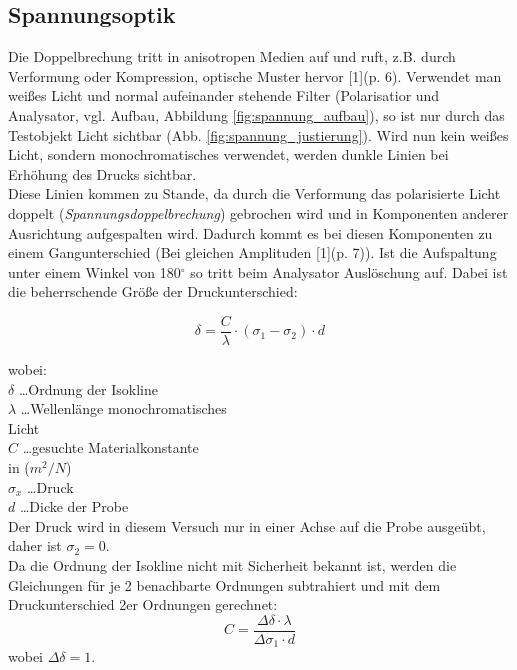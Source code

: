 \documentclass[12pt,a4paper]{article}
\begin{document}
\begin{multicols}{2}
\subsection{Spannungsoptik}
Die Doppelbrechung tritt in anisotropen Medien auf und ruft, z.B. durch Verformung oder Kompression, optische Muster hervor [1](p. 6). Verwendet man weißes Licht und normal aufeinander stehende Filter (Polarisatior und Analysator, vgl. Aufbau, Abbildung \ref{fig:spannung_aufbau}), so ist nur durch das Testobjekt Licht sichtbar (Abb. \ref{fig:spannung_justierung}). Wird nun kein weißes Licht, sondern monochromatisches verwendet, werden dunkle Linien bei Erhöhung des Drucks sichtbar.\\
Diese Linien kommen zu Stande, da durch die Verformung das polarisierte Licht doppelt (\emph{Spannungsdoppelbrechung}) gebrochen wird und in Komponenten anderer Ausrichtung aufgespalten wird. Dadurch kommt es bei diesen Komponenten zu einem Gangunterschied (Bei gleichen Amplituden [1](p. 7)). Ist die Aufspaltung unter einem Winkel von 180$^\circ$ so tritt beim Analysator Auslöschung auf. Dabei ist die beherrschende Größe der Druckunterschied:

$$\delta = \frac{C}{\lambda} \cdot (\sigma_1 - \sigma_2) \cdot d$$

\noindent
wobei:\\
$\delta$ \ldots Ordnung der Isokline\\
$\lambda$ \ldots Wellenlänge monochromatisches \\
\indent Licht\\
$C$ \ldots gesuchte Materialkonstante \\
\indent in ($m^2/N$)\\
$\sigma_x$ \ldots Druck\\
$d$ \ldots Dicke der Probe\\

Der Druck wird in diesem Versuch nur in einer Achse auf die Probe ausgeübt, daher ist $\sigma_2 = 0$.\\
Da die Ordnung der Isokline nicht mit Sicherheit bekannt ist, werden die Gleichungen für je 2 benachbarte Ordnungen subtrahiert und mit dem Druckunterschied 2er Ordnungen gerechnet:
$$C = \frac{\Delta \delta \cdot \lambda}{\Delta \sigma_1 \cdot d}$$
wobei $\Delta \delta = 1$.\\



\end{multicols}
\end{document}
